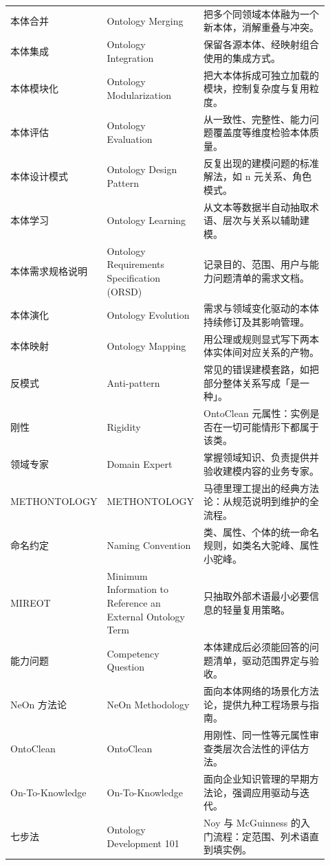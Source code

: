\begin{longtable}{@{}p{0.16\linewidth}p{0.26\linewidth}p{0.5\linewidth}@{}}
本体合并 & Ontology Merging & 把多个同领域本体融为一个新本体，消解重叠与冲突。 \\
本体集成 & Ontology Integration & 保留各源本体、经映射组合使用的集成方式。 \\
本体模块化 & Ontology Modularization & 把大本体拆成可独立加载的模块，控制复杂度与复用粒度。 \\
本体评估 & Ontology Evaluation & 从一致性、完整性、能力问题覆盖度等维度检验本体质量。 \\
本体设计模式 & Ontology Design Pattern & 反复出现的建模问题的标准解法，如 n 元关系、角色模式。 \\
本体学习 & Ontology Learning & 从文本等数据半自动抽取术语、层次与关系以辅助建模。 \\
本体需求规格说明 & Ontology Requirements Specification (ORSD) & 记录目的、范围、用户与能力问题清单的需求文档。 \\
本体演化 & Ontology Evolution & 需求与领域变化驱动的本体持续修订及其影响管理。 \\
本体映射 & Ontology Mapping & 用公理或规则显式写下两本体实体间对应关系的产物。 \\
反模式 & Anti-pattern & 常见的错误建模套路，如把部分整体关系写成「是一种」。 \\
刚性 & Rigidity & OntoClean 元属性：实例是否在一切可能情形下都属于该类。 \\
领域专家 & Domain Expert & 掌握领域知识、负责提供并验收建模内容的业务专家。 \\
METH\allowbreak ONTOLOGY & METH\allowbreak ONTOLOGY & 马德里理工提出的经典方法论：从规范说明到维护的全流程。 \\
命名约定 & Naming Convention & 类、属性、个体的统一命名规则，如类名大驼峰、属性小驼峰。 \\
MIREOT & Minimum Information to Reference an External Ontology Term & 只抽取外部术语最小必要信息的轻量复用策略。 \\
能力问题 & Competency Question & 本体建成后必须能回答的问题清单，驱动范围界定与验收。 \\
NeOn 方法论 & NeOn Methodology & 面向本体网络的场景化方法论，提供九种工程场景与指南。 \\
OntoClean & OntoClean & 用刚性、同一性等元属性审查类层次合法性的评估方法。 \\
On-To-Knowledge & On-To-Knowledge & 面向企业知识管理的早期方法论，强调应用驱动与迭代。 \\
七步法 & Ontology Development 101 & Noy 与 McGuinness 的入门流程：定范围、列术语直到填实例。 \\

\end{longtable}
